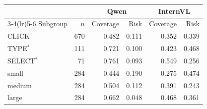 \begin{tabular}{@{}lrrrrr@{}}
\toprule
 & & \multicolumn{2}{c}{Qwen} & \multicolumn{2}{c}{InternVL} \\
\cmidrule(lr){3-4}\cmidrule(lr){5-6}
Subgroup & $n$ & Coverage & Risk & Coverage & Risk \\
\midrule
CLICK & 670 & 0.482 & 0.111 & 0.352 & 0.339 \\
TYPE$^*$ & 111 & 0.721 & 0.100 & 0.423 & 0.468 \\
SELECT$^*$ & 71 & 0.761 & 0.093 & 0.549 & 0.256 \\
small & 284 & 0.444 & 0.190 & 0.275 & 0.474 \\
medium & 284 & 0.504 & 0.112 & 0.391 & 0.243 \\
large & 284 & 0.662 & 0.048 & 0.468 & 0.361 \\
\bottomrule
\end{tabular}
